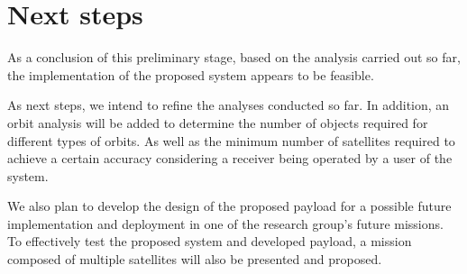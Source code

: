 %
%
%
%
%

%
%
%
%
%

\chapter{Next steps} \label{ch:conclusion}




As a conclusion of this preliminary stage, based on the analysis carried out so far, the implementation of the proposed system appears to be feasible.

As next steps, we intend to refine the analyses conducted so far. In addition, an orbit analysis will be added to determine the number of objects required for different types of orbits. As well as the minimum number of satellites required to achieve a certain accuracy considering a receiver being operated by a user of the system.

We also plan to develop the design of the proposed payload for a possible future implementation and deployment in one of the research group's future missions. To effectively test the proposed system and developed payload, a mission composed of multiple satellites will also be presented and proposed.